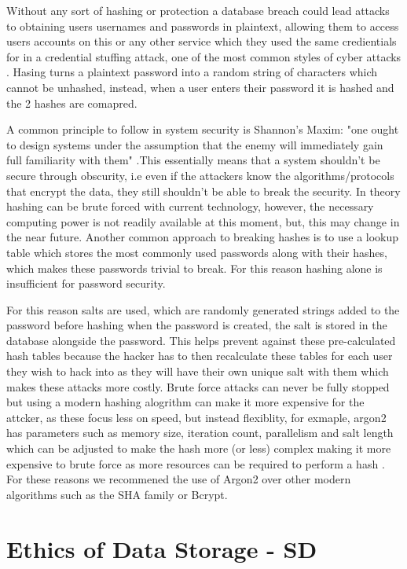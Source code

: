\documentclass[10pt]{report}
\begin{document}
Without any sort of hashing or protection a database breach could lead attacks to obtaining users usernames and passwords in plaintext, allowing them to access users accounts on this or any other service which they used the same credientials for in a credential stuffing attack, one of the most common styles of cyber attacks \cite{OWASP2020}. Hasing turns a plaintext password into a random string of characters which cannot be unhashed, instead, when a user enters their password it is hashed and the 2 hashes are comapred.

A common principle to follow in system security is Shannon's Maxim: "one ought to design systems under the assumption that the enemy will immediately gain full familiarity with them" \cite{Shannon1949}.This essentially means that a system shouldn’t be secure through obscurity, i.e even if the attackers know the algorithms/protocols that encrypt the data, they still shouldn’t be able to break the security. In theory hashing can be brute forced with current technology, however, the necessary computing power is not readily available at this moment, but, this may change in the near future. Another common approach to breaking hashes is to use a lookup table which stores the most commonly used passwords along with their hashes, which makes these passwords trivial to break. For this reason hashing alone is insufficient for password security. \cite{Tsudik1992}

For this reason salts are used, which are randomly generated strings added to the password before hashing when the password is created, the salt is stored in the database alongside the password. This helps prevent against these pre-calculated hash tables because the hacker has to then recalculate these tables for each user they wish to hack into as they will have their own unique salt with them which makes these attacks more costly. Brute force attacks can never be fully stopped but using a modern hashing alogrithm can make it more expensive for the attcker, as these focus less on speed, but instead flexiblity, for exmaple, argon2 has parameters such as memory size, iteration count, parallelism and salt length which can be adjusted to make the hash more (or less) complex making it more expensive to brute force as more resources can be required to perform a hash \cite{Biryukov2016}. For these reasons we recommened the use of Argon2 over other modern algorithms such as the SHA family or Bcrypt.

\section{Ethics of Data Storage - SD}
\label{res:datastor}
\end{document}
